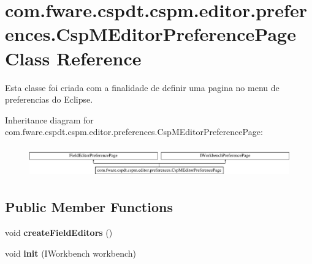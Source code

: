 \hypertarget{classcom_1_1fware_1_1cspdt_1_1cspm_1_1editor_1_1preferences_1_1_csp_m_editor_preference_page}{}\section{com.\+fware.\+cspdt.\+cspm.\+editor.\+preferences.\+Csp\+M\+Editor\+Preference\+Page Class Reference}
\label{classcom_1_1fware_1_1cspdt_1_1cspm_1_1editor_1_1preferences_1_1_csp_m_editor_preference_page}


Esta classe foi criada com a finalidade de definir uma pagina no menu de preferencias do Eclipse.  


Inheritance diagram for com.\+fware.\+cspdt.\+cspm.\+editor.\+preferences.\+Csp\+M\+Editor\+Preference\+Page\+:\begin{figure}[H]
\begin{center}
\leavevmode
\includegraphics[height=1.339713cm]{classcom_1_1fware_1_1cspdt_1_1cspm_1_1editor_1_1preferences_1_1_csp_m_editor_preference_page}
\end{center}
\end{figure}
\subsection*{Public Member Functions}
\begin{DoxyCompactItemize}
\item 
\mbox{\label{classcom_1_1fware_1_1cspdt_1_1cspm_1_1editor_1_1preferences_1_1_csp_m_editor_preference_page_a2e627e28e511a93196dfe421d048c5c1}} 
void {\bfseries create\+Field\+Editors} ()
\item 
\mbox{\label{classcom_1_1fware_1_1cspdt_1_1cspm_1_1editor_1_1preferences_1_1_csp_m_editor_preference_page_ac51adad6a9a8ab660d94a6400638b5c7}} 
void {\bfseries init} (I\+Workbench workbench)
\end{DoxyCompactItemize}


